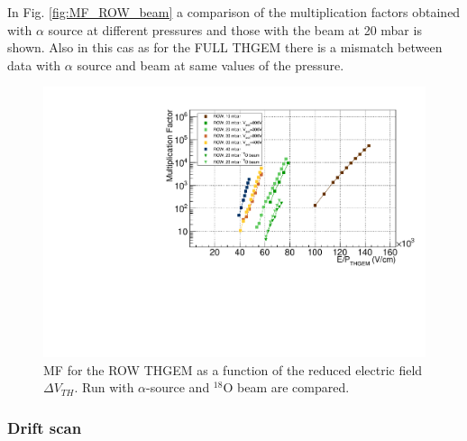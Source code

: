 \documentclass[a4paper, 11 pt]{report}
\newcommand{\Vthgem}{$\Delta V_{TH}$}
\begin{document}
  In Fig. \ref{fig:MF_ROW_beam} a comparison of the multiplication factors obtained with
  $\alpha$ source at different pressures and those with the beam at 20 mbar is shown. Also in this
  cas as for the FULL THGEM there is a mismatch between data with $\alpha$ source and
  beam at same values of the pressure.

  \begin{figure}[htbp]
	\centering						  
	\includegraphics[width=\textwidth]{Immagini/MF_ROW_THGEM_withBeam_F.pdf}
	\caption{MF for the ROW THGEM as a function of the reduced electric field\Vthgem{}. Run with 
	$\alpha$-source	and $^{18}$O beam are compared. }
	\label{fig:MF_ALL_beam}
  \end{figure}

  \clearpage
  \subsubsection{Drift scan}
\end{document}
